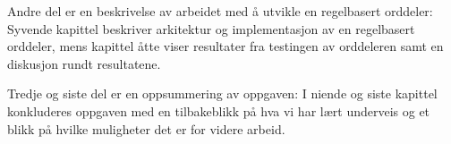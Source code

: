 Andre del er en beskrivelse av arbeidet med å utvikle en regelbasert orddeler: Syvende kapittel beskriver arkitektur og implementasjon av en regelbasert orddeler, mens kapittel åtte viser resultater fra testingen av orddeleren samt en diskusjon rundt resultatene.

Tredje og siste del er en oppsummering av oppgaven: I niende og siste kapittel konkluderes oppgaven med en tilbakeblikk på hva vi har lært underveis og et blikk på hvilke muligheter det er for videre arbeid.